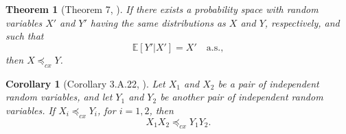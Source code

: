 \documentclass[pdflatex,sn-mathphys-num]{sn-jnl}
\theoremstyle{thmstyleone}
\newtheorem{theorem}{Theorem}
\newtheorem{corollary}{Corollary}
\theoremstyle{thmstyletwo}
\theoremstyle{thmstylethree}
\begin{document}
\begin{theorem}[Theorem 7, \cite{andrieu_establishing_2016}]
If there exists a probability space with random variables \( X' \) and \( Y' \) having the same distributions as \( X \) and \( Y\), respectively, and such that
\[\mathbb{E}[Y'|X'] = X' \quad \text{a.s.},\]
then \( X \preceq_{cx} Y \).
    \label{appendix:thm5}
\end{theorem}

\begin{corollary}[Corollary 3.A.22, \cite{shaked_stochastic_2007}]
Let \( X_1 \) and \( X_2 \) be a pair of independent random variables, and let \( Y_1 \) and \( Y_2 \) be another pair of independent random variables. If \( X_i {\preceq_{cx}} Y_i \), for \( i = 1, 2 \), then
\[X_1 X_2 \preceq_{cx} Y_1 Y_2.\]
\label{appendix:corollary3}
\end{corollary}
\end{document}
